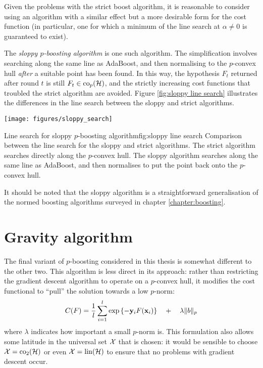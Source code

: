 Given the problems with the strict boost algorithm, it is reasonable
to consider using an algorithm with a similar effect but a more
desirable form for the cost function (in particular, one for which a
minimum of the line search at $\alpha \neq 0$ is guaranteed to
exist).

The \emph{sloppy $p$-boosting algorithm} is one such algorithm.  The
simplification involves searching along the same line as AdaBoost, and
then normalising to the $p$-convex hull \emph{after} a suitable point
has been found.  In this way, the hypothesis $F_t$ returned after
round $t$ is still $F_t \in \mathrm{co}_p(\mathcal{H})$, and the strictly increasing
cost functions that troubled the strict algorithm are avoided.  Figure
\ref{fig:sloppy line search} illustrates the differences in the line
search between the sloppy and strict algorithms.

\begin{linefigure}
\begin{center}
\texttt{[image: figures/sloppy\_search]}
\end{center}
\begin{capt}{Line search for sloppy $p$-boosting algorithm}{fig:sloppy line search}
Comparison between the line search for the sloppy and strict
algorithms.  The strict algorithm searches directly along the
$p$-convex hull.  The sloppy algorithm searches along the same line as
AdaBoost, and then normalises to put the point back onto the
$p$-convex hull.
\end{capt}
\end{linefigure}

It should be noted that the sloppy algorithm is a straightforward
generalisation of the normed boosting algorithms surveyed in chapter
\ref{chapter:boosting}.


\section{Gravity algorithm}

The final variant of $p$-boosting considered in this thesis is
somewhat different to the other two.  This algorithm is less direct in
its approach: rather than restricting the gradient descent algorithm
to operate on a $p$-convex hull, it modifies the cost functional to
``pull'' the solution towards a low $p$-norm:
%
\begin{equation}
C(F) = \frac{1}{l} \sum_{i=1}^{l} \exp
\left\{ -\mathbf{y}_iF(\mathbf{x}_i) \right\} \quad + \quad \lambda \|b\|_p
\label{eqn:regularisation}
\end{equation}
%
where $\lambda$ indicates how important a small $p$-norm is.  This
formulation also allows some latitude in the universal set $\mathcal{X}$
that is chosen: it would be sensible to choose $\mathcal{X} = \mathrm{co}_2(\mathcal{H})$
or even $\mathcal{X} = \mathrm{lin}(\mathcal{H})$ to ensure that no problems with gradient
descent occur.

